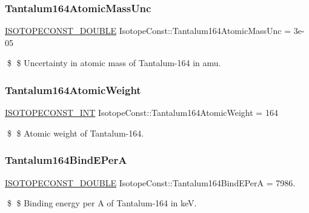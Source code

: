 \subsubsection{\texorpdfstring{Tantalum164\+Atomic\+Mass\+Unc}{Tantalum164AtomicMassUnc}}
{\footnotesize\ttfamily \mbox{\hyperlink{group___isotope_const-_macros_ga8f45a7272ce02c0b4c65c44636ed719a}{I\+S\+O\+T\+O\+P\+E\+C\+O\+N\+S\+T\+\_\+\+D\+O\+U\+B\+LE}} Isotope\+Const\+::\+Tantalum164\+Atomic\+Mass\+Unc = 3e-\/05}

\$ \$ Uncertainty in atomic mass of Tantalum-\/164 in amu. \mbox{\label{group___isotope_const-_tantalum-_ta164_ga4ea3f95c351140d4b93630a5efa4f5aa}} 
\subsubsection{\texorpdfstring{Tantalum164\+Atomic\+Weight}{Tantalum164AtomicWeight}}
{\footnotesize\ttfamily \mbox{\hyperlink{group___isotope_const-_macros_ga5f18360b3e99483a35c32d789e62621c}{I\+S\+O\+T\+O\+P\+E\+C\+O\+N\+S\+T\+\_\+\+I\+NT}} Isotope\+Const\+::\+Tantalum164\+Atomic\+Weight = 164}

\$ \$ Atomic weight of Tantalum-\/164. \mbox{\label{group___isotope_const-_tantalum-_ta164_gaf4278f6d588068d24af461cd5b2ff6bd}} 
\subsubsection{\texorpdfstring{Tantalum164\+Bind\+E\+PerA}{Tantalum164BindEPerA}}
{\footnotesize\ttfamily \mbox{\hyperlink{group___isotope_const-_macros_ga8f45a7272ce02c0b4c65c44636ed719a}{I\+S\+O\+T\+O\+P\+E\+C\+O\+N\+S\+T\+\_\+\+D\+O\+U\+B\+LE}} Isotope\+Const\+::\+Tantalum164\+Bind\+E\+PerA = 7986.}

\$ \$ Binding energy per A of Tantalum-\/164 in keV. \mbox{\label{group___isotope_const-_tantalum-_ta164_ga753bbc502ea843185d66e955707fa9b5}} 
